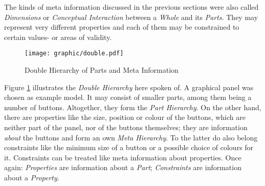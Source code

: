 The kinds of meta information discussed in the previous sections were also
called \emph{Dimensions} or \emph{Conceptual Interaction} between a \emph{Whole}
and its \emph{Parts}. They may represent very different properties and each of
them may be constrained to certain values- or areas of validity.

\begin{figure}[ht]
    \begin{center}
        \texttt{[image: graphic/double.pdf]}
        \caption{Double Hierarchy of Parts and Meta Information}
        \label{double_figure}
    \end{center}
\end{figure}

Figure \ref{double_figure} illustrates the \emph{Double Hierarchy} here
spoken of. A graphical panel was chosen as example model. It may consist of
smaller parts, among them being a number of buttons. Altogether, they form the
\emph{Part Hierarchy}. On the other hand, there are properties like the size,
position or colour of the buttons, which are neither part of the panel, nor of
the buttons themselves; they are information \emph{about} the buttons and form
an own \emph{Meta Hierarchy}. To the latter do also belong constraints like the
minimum size of a button or a possible choice of colours for it. Constraints can
be treated like meta information about properties. Once again: \emph{Properties}
are information about a \emph{Part}; \emph{Constraints} are information about a
\emph{Property}.
